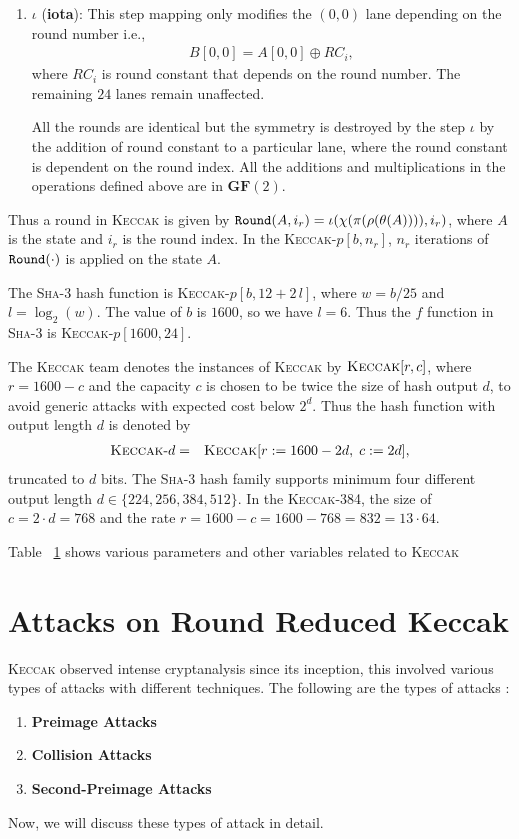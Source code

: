 \documentclass[runningheads]{llncs}
\newcommand{\KECCAK}{\mbox{\textsc{Keccak}}}
\newcommand{\Keccak}{\mbox{\textsc{Keccak}}}
\newcommand{\SHA}{\textsc{Sha}}
\begin{document}
\begin{enumerate}
    $\chi$ is the only non-linear operation among the $5$ step mappings in \KECCAK{}.
    
    \vskip5pt
    \item $\iota$ ({\bf iota}): This step mapping only modifies the $(0, 0)$ lane depending on the round number i.e., 
    \begin{align}
       B[0, 0] = A[0, 0] \oplus RC_i,
   \end{align}
    where $RC_i$ is round constant that depends on the round number. The remaining $24$ lanes remain unaffected.
    
    All the rounds are identical but the symmetry is destroyed by the step $\iota$ by the addition of round constant to a particular lane, where the round constant is dependent on the round index.
    All the additions and multiplications in the operations defined above are in $\textbf{GF}(2)$.
\end{enumerate}

Thus a round in \Keccak{} is given by ${\tt Round}(A, i_r) = \iota( \chi( \pi ( \rho ( \theta ( A ) ) ) ) , i_r)$, where $A$ is the state and $i_r$ is the round index. In the \Keccak-$p[b, n_r]$, $n_r$ iterations of ${\tt Round}(\cdot)$ is applied on the state $A$.

The \SHA-3 hash function is \Keccak-$p[b, 12 + 2\,l]$, where $w = b/25$ and $l = \log_{2}(w)$. The value of $b$ is $1600$, so we have $l = 6$. Thus the $f$ function in \SHA-3 is \Keccak-$p[1600, 24]$.

The \Keccak{} team denotes the instances of \Keccak{} by $\Keccak[r,c]$, where $r=1600-c$ and the capacity $c$ is chosen to be twice the size of hash output $d$, to avoid generic attacks with expected cost below $2^d$. Thus the hash function with output length $d$ is denoted by 
\begin{eqnarray}
\mbox{\Keccak-$d$}  &=& \Keccak[r:=1600-2d,\;c:=2d],
\end{eqnarray}
truncated to $d$ bits.
The \SHA-3 hash family supports minimum four different output length $d \in \{224,256,384,512\}$. In the \Keccak-384, the size of $c = 2\cdot d = 768$ and the rate $r = 1600 - c = 1600 - 768 = 832= 13\cdot 64$.

Table ~\ref{} shows various parameters and other variables related to \KECCAK{}

\section{Attacks on Round Reduced Keccak}
\KECCAK{} observed intense cryptanalysis since its inception, this involved various types of attacks with different techniques. The following are the types of attacks :
\begin{enumerate}
	\item \textbf{Preimage Attacks}
	\item \textbf{Collision Attacks}
	\item \textbf{Second-Preimage Attacks}
\end{enumerate}
Now, we will discuss these types of attack in detail.
\end{document}
